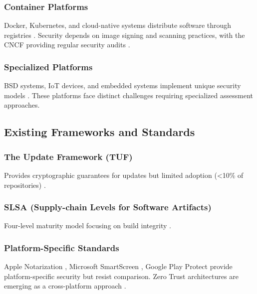 \documentclass[11pt,a4paper]{article}
\begin{document}
\subsubsection{Container Platforms}

Docker, Kubernetes, and cloud-native systems distribute software through registries \cite{kubernetes2024security,docker2024supply}. Security depends on image signing and scanning practices, with the CNCF providing regular security audits \cite{kubernetes2024security}.

\subsubsection{Specialized Platforms}

BSD systems, IoT devices, and embedded systems implement unique security models \cite{kumar2024iot,sadeghi2024embedded}. These platforms face distinct challenges requiring specialized assessment approaches.

\subsection{Existing Frameworks and Standards}

\subsubsection{The Update Framework (TUF)}

Provides cryptographic guarantees for updates but limited adoption (<10\% of repositories) \cite{kuppusamy2016tuf}.

\subsubsection{SLSA (Supply-chain Levels for Software Artifacts)}

Four-level maturity model focusing on build integrity \cite{google2021slsa}.

\subsubsection{Platform-Specific Standards}

Apple Notarization \cite{apple2023security}, Microsoft SmartScreen \cite{microsoft2024windows}, Google Play Protect \cite{google2024android} provide platform-specific security but resist comparison. Zero Trust architectures are emerging as a cross-platform approach \cite{nist2024zerotrust,rose2024zerotrust}.
\end{document}
